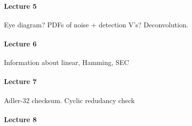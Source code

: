 \documentclass{article}
\begin{document}
\paragraph{Lecture 5}

Eye diagram? PDFs of noise + detection V's? Deconvolution.

\paragraph{Lecture 6}

Information about linear, Hamming, SEC

\paragraph{Lecture 7}

Adler-32 checksum. Cyclic redudancy check

\paragraph{Lecture 8}
\end{document}
